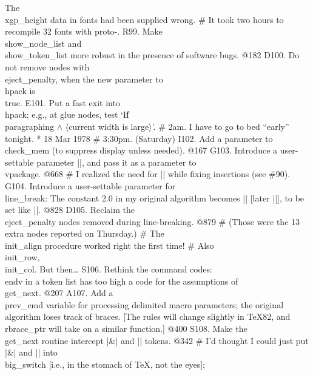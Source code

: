 {	The \\{xgp_height} data in fonts had been supplied wrong.
# It took two hours to recompile 32 fonts with proto-\MF.
R99. Make \\{show_node_list} and \\{show_token_list}
	more robust in the presence of software bugs. @182
D100. Do not remove nodes with \\{eject_penalty},
	when the new parameter to \\{hpack} is \\{true}.
E101. Put a fast exit into \\{hpack}; e.g., at glue nodes, test `{\bf if}
	\\{paragraphing} $\land$ $\langle$current width is large$\rangle$'.
# 2am. I have to go to bed ``early'' tonight.
* 18 Mar 1978
# 3:30pm. (Saturday)
I102. Add a parameter to \\{check_mem} (to suppress display unless needed). @167
G103. Introduce a user-settable parameter |\maxdepth|, and
	pass it as a parameter to \\{vpackage}. @668
# I realized the need for |\maxdepth| while fixing insertions (see \#90).
G104. Introduce a user-settable parameter for \\{line_break}: The constant
	2.0 in my original algorithm becomes |\jpar|
	[later |\tolerance|], to be set like |\tracing|. @828
D105. Reclaim the \\{eject_penalty} nodes removed during line-breaking. @879
# (Those were the 13 extra nodes reported on Thursday.)
# The \\{init_align} procedure worked right the first time!
# Also \\{init_row}, \\{init_col}. But then\thinspace\dots
S106. Rethink the command codes: \\{endv} in a token list has too high a
	code for the assumptions of \\{get_next}. @207
A107. Add a \\{prev_cmd} variable for processing delimited macro parameters;
	the original algorithm loses track of braces.
	[The rules will change slightly in \TeX82, and
	\\{rbrace_ptr} will take on a similar function.] @400
S108. Make the \\{get_next} routine intercept |&| and |\cr| tokens. @342
# I'd thought I could just put |&| and |\cr| into
	\\{big_switch} [i.e., in the stomach of \TeX, not the eyes];
}
